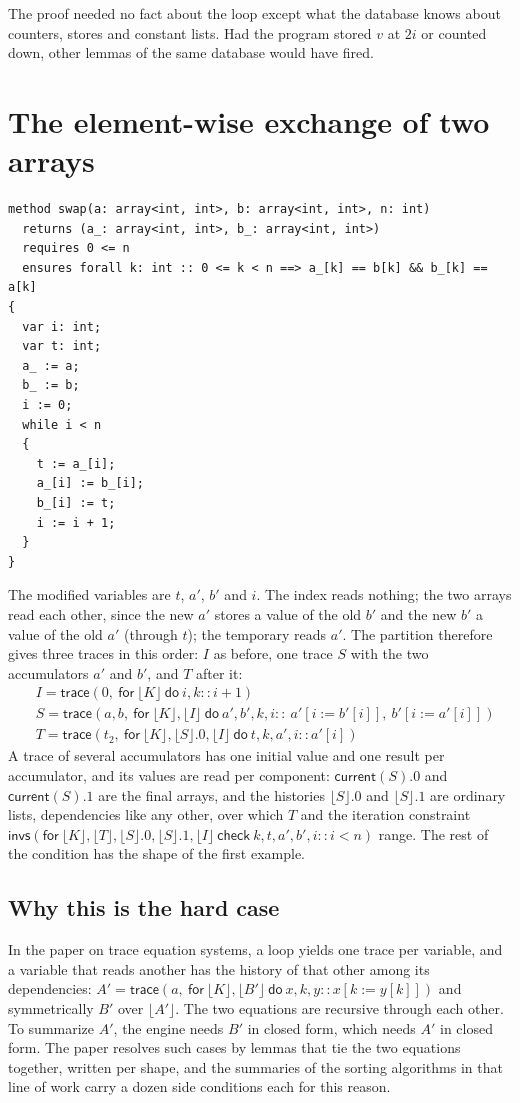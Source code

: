 \documentclass[11pt,a4paper]{article}
\newcommand{\bl}[1]{\lfloor #1\rfloor}                       %
\newcommand{\tr}[3]{\mathsf{trace}(#1,\ \mathsf{for}\ #2\ \mathsf{do}\ #3)}
\newcommand{\al}[2]{\mathsf{invs}(\mathsf{for}\ #1\ \mathsf{check}\ #2)}
\newcommand{\cur}{\mathsf{current}}
\begin{document}
The proof needed no fact about the loop except what the database knows about counters, stores and constant lists.
Had the program stored $v$ at $2i$ or counted down, other lemmas of the same database would have fired.

\section{The element-wise exchange of two arrays}

\begin{lstlisting}
method swap(a: array<int, int>, b: array<int, int>, n: int)
  returns (a_: array<int, int>, b_: array<int, int>)
  requires 0 <= n
  ensures forall k: int :: 0 <= k < n ==> a_[k] == b[k] && b_[k] == a[k]
{
  var i: int;
  var t: int;
  a_ := a;
  b_ := b;
  i := 0;
  while i < n
  {
    t := a_[i];
    a_[i] := b_[i];
    b_[i] := t;
    i := i + 1;
  }
}
\end{lstlisting}

The modified variables are $t$, $a'$, $b'$ and $i$. The index reads nothing; the two arrays read each other, since
the new $a'$ stores a value of the old $b'$ and the new $b'$ a value of the old $a'$ (through $t$); the temporary
reads $a'$. The partition therefore gives three traces in this order: $I$ as before, one trace $S$ with the two
accumulators $a'$ and $b'$, and $T$ after it:
\begin{align*}
&I = \tr{0}{\bl{K}}{i, k :: i + 1}\\
&S = \mathsf{trace}(a, b,\ \mathsf{for}\ \bl{K}, \bl{I}\ \mathsf{do}\ a', b', k, i ::\ a'[i := b'[i]],\ b'[i := a'[i]])\\
&T = \tr{t_2}{\bl{K}, \bl{S}.0, \bl{I}}{t, k, a', i :: a'[i]}
\end{align*}
A trace of several accumulators has one initial value and one result per accumulator, and its values are read per
component: $\cur(S).0$ and $\cur(S).1$ are the final arrays, and the histories $\bl{S}.0$ and $\bl{S}.1$ are
ordinary lists, dependencies like any other, over which $T$ and the iteration constraint
$\al{\bl{K}, \bl{T}, \bl{S}.0, \bl{S}.1, \bl{I}}{k, t, a', b', i :: i < n}$ range. The rest of the condition has
the shape of the first example.

\subsection{Why this is the hard case}

In the paper on trace equation systems, a loop yields one trace per variable, and a variable that reads another has
the history of that other among its dependencies: $A' = \tr{a}{\bl{K}, \bl{B'}}{x, k, y :: x[k := y[k]]}$ and
symmetrically $B'$ over $\bl{A'}$. The two equations are recursive through each other. To summarize $A'$, the
engine needs $B'$ in closed form, which needs $A'$ in closed form. The paper resolves such cases by lemmas that tie
the two equations together, written per shape, and the summaries of the sorting algorithms in that line of work
carry a dozen side conditions each for this reason.
\end{document}
